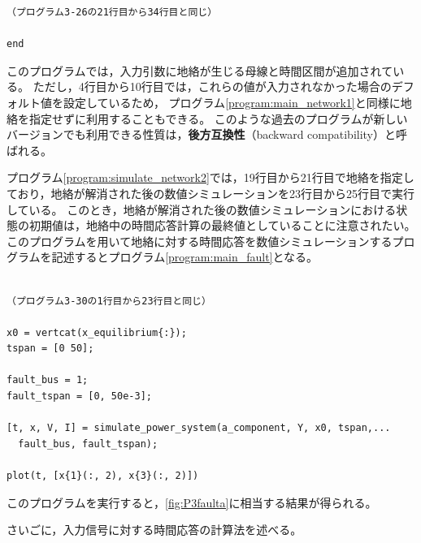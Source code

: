 \documentclass[tombow,dvipdfmx]{corona-a5-1.1}
\begin{document}
\begin{例}[地絡に対する時間応答の数値計算]
\begin{PROGRAMA}[count,title={simulate\_power\_system.m}]
\begin{verbatim}
（プログラム3-26の21行目から34行目と同じ）

end
\end{verbatim}
\end{PROGRAMA}

このプログラムでは，入力引数に地絡が生じる母線と時間区間が追加されている。
ただし，4行目から10行目では，これらの値が入力されなかった場合のデフォルト値を設定しているため，
プログラム\nobreak\ref{program:main_network1}と同様に地絡を指定せずに利用することもできる。
このような過去のプログラムが新しいバージョンでも利用できる性質は，\textbf{後方互換性}（backward compatibility）と呼ばれる。

プログラム\nobreak\ref{program:simulate_network2}では，19行目から21行目で地絡を指定しており，地絡が解消された後の数値シミュレーションを23行目から25行目で実行している。
このとき，地絡が解消された後の数値シミュレーションにおける状態の初期値は，地絡中の時間応答計算の最終値としていることに注意されたい。
このプログラムを用いて地絡に対する時間応答を数値シミュレーションするプログラムを記述するとプログラム\nobreak\ref{program:main_fault}となる。

\smallskip
\begin{PROGRAMA}[count,title={main\_simulation\_3bus\_fault.m}]\label{program:main_fault}
\begin{verbatim}

（プログラム3-30の1行目から23行目と同じ）

x0 = vertcat(x_equilibrium{:});
tspan = [0 50];

fault_bus = 1;
fault_tspan = [0, 50e-3];

[t, x, V, I] = simulate_power_system(a_component, Y, x0, tspan,...
  fault_bus, fault_tspan);

plot(t, [x{1}(:, 2), x{3}(:, 2)])
\end{verbatim}
\end{PROGRAMA}

このプログラムを実行すると，\ref{fig:P3faulta}に相当する結果が得られる。
\end{例}

さいごに，入力信号に対する時間応答の計算法を述べる。
\end{document}
